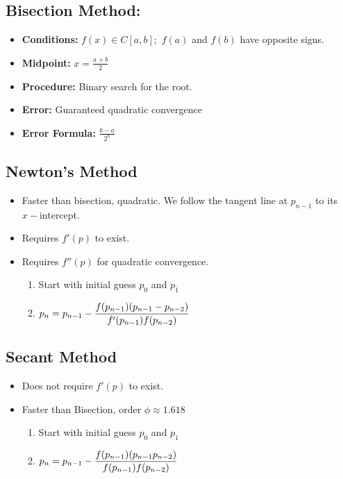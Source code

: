 \documentclass[9pt, letterpaper]{extarticle}
\begin{document}
\begin{multicols*}{3}
  \subsection{Bisection Method:}

  \begin{itemize}
    \item \textbf{Conditions:} $f(x) \in C[a,b];$ \newline
      $f(a)$ and $f(b)$ have opposite signs.
    \item \textbf{Midpoint:} $x = \frac{a+b}{2}$
    \item \textbf{Procedure:} Binary search for the root.
    \item \textbf{Error:} Guaranteed quadratic convergence 
    \item \textbf{Error Formula:} $\frac{b-a}{2^n}$
  \end{itemize}

  \subsection{Newton's Method}
  \begin{itemize}
    \item Faster than bisection, quadratic. We follow the tangent line at $p_{n-1}$ to its
      $x-$intercept.
    \item Requires $f'(p)$ to exist.
    \item Requires $f''(p)$ for quadratic convergence.
      \begin{enumerate}
        \item Start with initial guess $p_0$ and $p_1$
        \item $\displaystyle p_n = p_{n-1} -
          \frac{f(p_{n-1})\pqty{p_{n-1}-p_{n-2}}}{f'(p_{n-1})f(p_{n-2})}$
      \end{enumerate}
  \end{itemize}

  \subsection{Secant Method}
  \begin{itemize}
    \item Does not require $f'(p)$ to exist.
    \item Faster than Bisection, order $\phi \approx 1.618$
      \begin{enumerate}
      \item Start with initial guess $p_0$ and $p_1$
      \item $\displaystyle p_n = p_{n-1} -
        \frac{f(p_{n-1})\pqty{p_{n-1}p_{n-2}}}{f(p_{n-1})f(p_{n-2})}$
      \end{enumerate}
  \end{itemize}


\end{multicols*}
\end{document}
